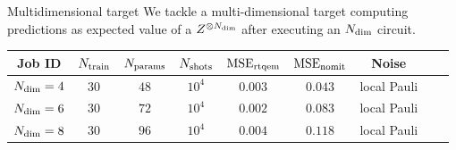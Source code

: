 \documentclass[8pt, xcolor={svgnames}, hyperref={linkcolor=black}]{beamer}
\begin{document}
\begin{frame}{Multidimensional target}
We tackle a multi-dimensional target computing predictions as expected value of 
a $Z^{\otimes N_{\rm \dim}}$ after executing an $N_{\rm \dim}$ circuit.

\begin{center}
\footnotesize
\begin{tabular}{ccccccccc}
\hline \hline 
\rule{0pt}{2.5ex}
\textbf{Job ID} & $N_{\rm train}$ & $N_{\rm params}$ & $N_{\rm shots}$ 
& $\text{MSE}_{\rm rtqem}$ &  $\text{MSE}_{\rm nomit}$ & Noise \\
\hline
$N_{\rm dim}=4$ & $30$ & $48$ & $10^{4}$ &  $0.003$ & $0.043$ & local Pauli \\
$N_{\rm dim}=6$ & $30$ & $72$ & $10^{4}$ &  $0.002$ & $0.083$ & local Pauli \\
$N_{\rm dim}=8$ & $30$ & $96$ & $10^{4}$ &  $0.004$ & $0.118$ & local Pauli \\
\hline \hline 
\end{tabular}
\end{center}


\end{frame}
\end{document}
